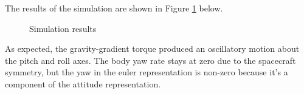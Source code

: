 \documentclass[]{aiaa-tc}%
\begin{document}
The results of the simulation are shown in Figure \ref{fig:SimResults} below.
	\begin{figure}[H]
		\centering
		\caption{Simulation results }
		\label{fig:SimResults}
	\end{figure}	

As expected, the gravity-gradient torque produced an oscillatory motion about the pitch and roll axes. The body yaw rate stays at zero due to the spacecraft symmetry, but the yaw in the euler representation is non-zero because it's a component of the attitude representation.
\end{document}
